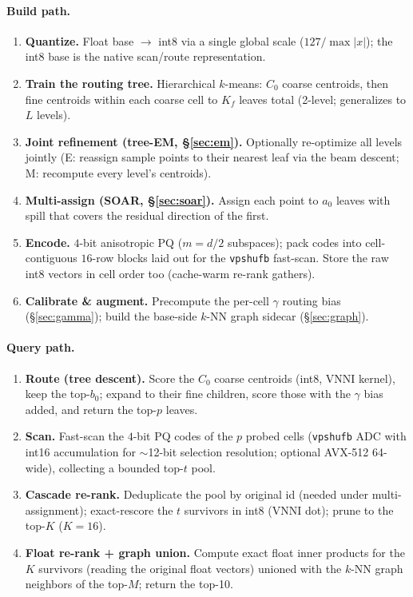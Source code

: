 \documentclass{article}
\begin{document}
\paragraph{Build path.}
\begin{enumerate}
  \item \textbf{Quantize.} Float base $\to$ int8 via a single global scale
    ($127/\max|x|$); the int8 base is the native scan/route representation.
  \item \textbf{Train the routing tree.} Hierarchical $k$-means: $C_0$ coarse
    centroids, then fine centroids within each coarse cell to $K_f$ leaves total
    (2-level; generalizes to $L$ levels).
  \item \textbf{Joint refinement (tree-EM, \S\ref{sec:em}).} Optionally re-optimize
    all levels jointly (E: reassign sample points to their nearest leaf via the beam
    descent; M: recompute every level's centroids).
  \item \textbf{Multi-assign (SOAR, \S\ref{sec:soar}).} Assign each point to $a_0$
    leaves with spill that covers the residual direction of the first.
  \item \textbf{Encode.} $4$-bit anisotropic PQ ($m{=}d/2$ subspaces); pack codes
    into cell-contiguous $16$-row blocks laid out for the \texttt{vpshufb} fast-scan.
    Store the raw int8 vectors in cell order too (cache-warm re-rank gathers).
  \item \textbf{Calibrate \& augment.} Precompute the per-cell $\gamma$ routing bias
    (\S\ref{sec:gamma}); build the base-side $k$-NN graph sidecar (\S\ref{sec:graph}).
\end{enumerate}

\paragraph{Query path.}
\begin{enumerate}
  \item \textbf{Route (tree descent).} Score the $C_0$ coarse centroids (int8, VNNI
    kernel), keep the top-$b_0$; expand to their fine children, score those with the
    $\gamma$ bias added, and return the top-$p$ leaves.
  \item \textbf{Scan.} Fast-scan the $4$-bit PQ codes of the $p$ probed cells
    (\texttt{vpshufb} ADC with int16 accumulation for $\sim$12-bit selection
    resolution; optional AVX-512 64-wide), collecting a bounded top-$t$ pool.
  \item \textbf{Cascade re-rank.} Deduplicate the pool by original id (needed under
    multi-assignment); exact-rescore the $t$ survivors in int8 (VNNI dot); prune to
    the top-$K$ ($K{=}16$).
  \item \textbf{Float re-rank + graph union.} Compute exact float inner products for
    the $K$ survivors (reading the original float vectors) unioned with the $k$-NN
    graph neighbors of the top-$M$; return the top-10.
\end{enumerate}
\end{document}

